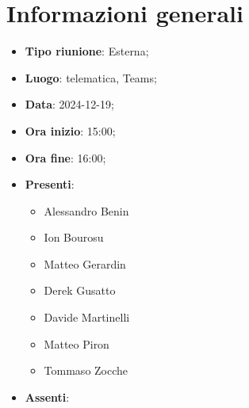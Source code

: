 \section{Informazioni generali}
\begin{itemize}
  \item \textbf{Tipo riunione}: Esterna;
  \item \textbf{Luogo}: telematica, Teams;
  \item \textbf{Data}: 2024-12-19;
  \item \textbf{Ora inizio}: 15:00;
  \item \textbf{Ora fine}: 16:00;
  
  \item \textbf{Presenti}:
  \begin{itemize}
    \item Alessandro Benin
    \item Ion Bourosu
    \item Matteo Gerardin
    \item Derek Gusatto
    \item Davide Martinelli
    \item Matteo Piron
    \item Tommaso Zocche
  \end{itemize}

  \item \textbf{Assenti}:
 
\end{itemize}